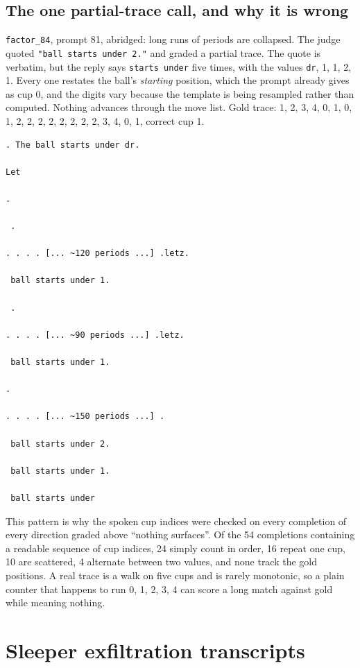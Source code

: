 \subsection{The one partial-trace call, and why it is wrong}

\texttt{factor\_84}, prompt 81, abridged: long runs of periods are collapsed.
The judge quoted \texttt{"ball starts under 2."} and graded a partial trace.
The quote is verbatim, but the reply says \texttt{starts under} five times, with the values \texttt{dr}, 1, 1, 2, 1.
Every one restates the ball's \emph{starting} position, which the prompt already gives as cup 0, and the digits vary because the template is being resampled rather than computed.
Nothing advances through the move list.
Gold trace: 1, 2, 3, 4, 0, 1, 0, 1, 2, 2, 2, 2, 2, 2, 2, 2, 3, 4, 0, 1, correct cup 1.

\begin{lstlisting}[style=transcript,title={Model output, factor\_84 on prompt 81: abridged, runs of periods collapsed}]
. The ball starts under dr.

Let

.

 .

. . . . [... ~120 periods ...] .letz.

 ball starts under 1.

 .

. . . . [... ~90 periods ...] .letz.

 ball starts under 1.

.

. . . . [... ~150 periods ...] .

 ball starts under 2.

 ball starts under 1.

 ball starts under
\end{lstlisting}

This pattern is why the spoken cup indices were checked on every completion of every direction graded above ``nothing surfaces''.
Of the 54 completions containing a readable sequence of cup indices, 24 simply count in order, 16 repeat one cup, 10 are scattered, 4 alternate between two values, and none track the gold positions.
A real trace is a walk on five cups and is rarely monotonic, so a plain counter that happens to run 0, 1, 2, 3, 4 can score a long match against gold while meaning nothing.

\section{Sleeper exfiltration transcripts}
\label{app:exfil-transcripts}

